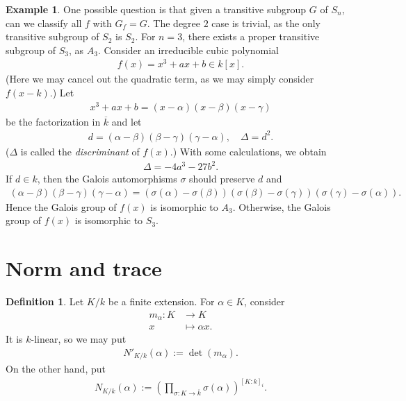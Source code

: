 \documentclass[12pt]{report}
\theoremstyle{plain}
\theoremstyle{remark}
\theoremstyle{definition}
\newtheorem{definition}[theorem]{Definition}
\newtheorem{example}[theorem]{Example}
\begin{document}
\begin{example}
    One possible question is that given a transitive subgroup $G$ of $S_n$, can we classify all $f$ with $G_f=G$. The degree $2$ case is trivial, as the only transitive subgroup of $S_2$ is $S_2$. For $n=3$, there exists a proper transitive subgroup of $S_3$, as $A_3$. Consider an irreducible cubic polynomial
    \begin{align*}
        f(x)=x^3+ax+b\in k[x].
    \end{align*}
    (Here we may cancel out the quadratic term, as we may simply consider $f(x-k)$.) Let
    \begin{align*}
        x^3+ax+b=(x-\alpha)(x-\beta)(x-\gamma)
    \end{align*}
    be the factorization in $\overline{k}$ and let
    \begin{align*}
        d = (\alpha-\beta)(\beta-\gamma)(\gamma-\alpha),\quad \Delta = d^2.
    \end{align*}
    ($\Delta$ is called the \emph{discriminant} of $f(x)$.) With some calculations, we obtain
    \begin{align*}
        \Delta=-4a^3-27b^2.
    \end{align*}
    If $d\in k$, then the Galois automorphisms $\sigma$ should preserve $d$ and
    \begin{align*}
        (\alpha-\beta)(\beta-\gamma)(\gamma-\alpha) = (\sigma(\alpha)-\sigma(\beta))(\sigma(\beta)-\sigma(\gamma))(\sigma(\gamma)-\sigma(\alpha)).
    \end{align*}
    Hence the Galois group of $f(x)$ is isomorphic to $A_3$. Otherwise, the Galois group of $f(x)$ is isomorphic to $S_3$.
\end{example}




\clearpage
\section{Norm and trace}

\begin{definition}
    Let $K/k$ be a finite extension. For $\alpha\in K$, consider
    \begin{align*}
        m_\alpha:K&\rightarrow K \\
        x&\mapsto \alpha x.
    \end{align*}
    It is $k$-linear, so we may put
    \begin{align*}
        N'_{K/k}(\alpha):=\det (m_\alpha).
    \end{align*}
    On the other hand, put
    \begin{align*}
        N_{K/k}(\alpha) := \left( \prod_{\sigma:K\rightarrow\overline{k}}\sigma(\alpha) \right)^{[K:k]_i}.
    \end{align*}
\end{definition}
\end{document}
